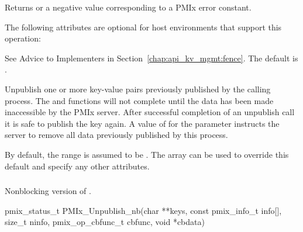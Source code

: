 Returns  or a negative value corresponding to a PMIx error constant.

\optattrstart
The following attributes are optional for host environments that support this operation:

See Advice to Implementers in Section~\ref{chap:api_kv_mgmt:fence}.
\pastePRIAttributeItemEnd
{}
The default is .
\pastePRIAttributeItemEnd

\optattrend

\descr

Unpublish one or more key-value pairs previously published by the calling process.
The  and  functions will not complete until the data has been made inaccessible by the \ac{PMIx} server.
After successful completion of an unpublish call it is safe to publish the key again.
A value of  for the  parameter instructs the server to remove all data previously published by this process.

By default, the range is assumed to be .
The  array can be used to override this default and specify any other attributes.


\subsubsection{}

\summary

Nonblocking version of .

\format

\cspecificstart
\begin{codepar}
pmix_status_t
PMIx_Unpublish_nb(char **keys,
                  const pmix_info_t info[], size_t ninfo,
                  pmix_op_cbfunc_t cbfunc, void *cbdata)
\end{codepar}
\cspecificend

\begin{arglist}
\end{arglist}

